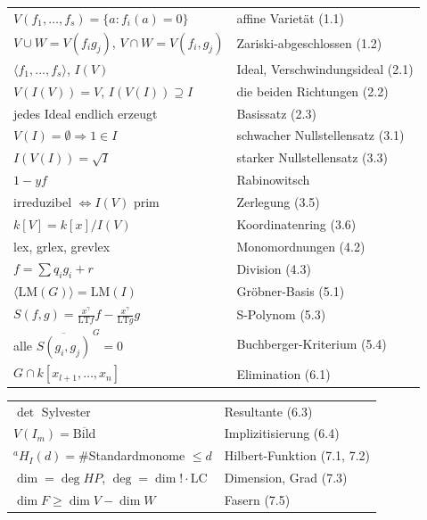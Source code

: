 \begin{merksatz}
\begin{center}
{\small
\renewcommand{\arraystretch}{1.6}
\begin{tabular}{@{}P{4.6cm}P{4.0cm}@{}}
\toprule
$V(f_1, \ldots, f_s) = \{a : f_i(a) = 0\}$ & affine Varietät (1.1)\\
$V\cup W = V(f_ig_j)$, $V\cap W = V(f_i, g_j)$ & Zariski-abgeschlossen (1.2)\\
$\langle f_1, \ldots, f_s\rangle$, $I(V)$ & Ideal, Verschwindungsideal (2.1)\\
$V(I(V)) = V$, $I(V(I))\supseteq I$ & die beiden Richtungen (2.2)\\
jedes Ideal endlich erzeugt & Basissatz (2.3)\\
$V(I) = \emptyset\Rightarrow1\in I$ & schwacher Nullstellensatz (3.1)\\
$I(V(I)) = \sqrt I$ & starker Nullstellensatz (3.3)\\
$1 - yf$ & Rabinowitsch\\
irreduzibel $\iff I(V)$ prim & Zerlegung (3.5)\\
$k[V] = k[x]/I(V)$ & Koordinatenring (3.6)\\
lex, grlex, grevlex & Monomordnungen (4.2)\\
$f = \sum q_ig_i + r$ & Division (4.3)\\
$\langle\mathrm{LM}(G)\rangle = \mathrm{LM}(I)$ & Gröbner-Basis (5.1)\\
$S(f, g) = \frac{x^{\gamma}}{\mathrm{LT}f}f - \frac{x^{\gamma}}{\mathrm{LT}g}g$ & S-Polynom (5.3)\\
alle $\overline{S(g_i, g_j)}^{\,G} = 0$ & Buchberger-Kriterium (5.4)\\
$G\cap k[x_{l+1}, \ldots, x_n]$ & Elimination (6.1)\\
\bottomrule
\end{tabular}}
\end{center}
\begin{center}
{\small
\renewcommand{\arraystretch}{1.6}
\begin{tabular}{@{}P{4.6cm}P{4.0cm}@{}}
\toprule
$\det$ Sylvester & Resultante (6.3)\\
$V(I_m) = \overline{\text{Bild}}$ & Implizitisierung (6.4)\\
${}^{a}\!H_I(d) = \#$Standardmonome $\le d$ & Hilbert-Funktion (7.1, 7.2)\\
$\dim = \deg HP$, $\deg = \dim!\cdot\mathrm{LC}$ & Dimension, Grad (7.3)\\
$\dim F\ge\dim V - \dim W$ & Fasern (7.5)\\

\end{tabular}}
\end{center}
\end{merksatz}
